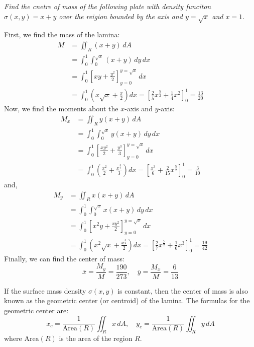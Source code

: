 \documentclass[11pt]{report}
\begin{document}
\begin{example}
    \textit{Find the cnetre of mass of the following plate with density funciton $\sigma(x,y) = x + y$ over the reigion bounded by the axis and $y = \sqrt{x}$ and $x = 1$.}

    First, we find the mass of the lamina:
    \begin{align*}
        M &= \iint_R (x + y) \, dA \\
        &= \int_0^1 \int_0^{\sqrt{x}} (x + y) \, dy \, dx \\
        &= \int_0^1 \left[ xy + \frac{y^2}{2} \right]_{y=0}^{y=\sqrt{x}} \, dx \\
        &= \int_0^1 \left( x\sqrt{x} + \frac{x}{2} \right) dx = \left[ \frac{2}{5} x^{\frac{5}{2}} + \frac{1}{4} x^2 \right]_{0}^{1} = \frac{13}{20}
    \end{align*}
    Now, we find the moments about the $x$-axis and $y$-axis:
    \begin{align*}
        M_x &= \iint_R y(x + y) \, dA \\
        &= \int_0^1 \int_0^{\sqrt{x}} y(x + y) \, dy \, dx \\
        &= \int_0^1 \left[ \frac{xy^2}{2} + \frac{y^3}{3} \right]_{y=0}^{y=\sqrt{x}} \, dx \\
        &= \int_0^1 \left( \frac{x^2}{2} + \frac{x^{\frac{3}{2}}}{3} \right) dx = \left[ \frac{x^3}{6} + \frac{2}{15} x^{\frac{5}{2}} \right]_{0}^{1} = \frac{3}{10}
    \end{align*}
    and,
    \begin{align*}
        M_y &= \iint_R x(x + y) \, dA \\
        &= \int_0^1 \int_0^{\sqrt{x}} x(x + y) \, dy \, dx \\
        &= \int_0^1 \left[ x^2y + \frac{xy^2}{2} \right]_{y=0}^{y=\sqrt{x}} \, dx \\
        &= \int_0^1 \left( x^2\sqrt{x} + \frac{x^{\frac{3}{2}}}{2} \right) dx = \left[ \frac{2}{7} x^{\frac{7}{2}} + \frac{1}{6} x^3 \right]_{0}^{1} = \frac{19}{42}
    \end{align*}
    Finally, we can find the center of mass:
    $$        
    \bar{x} = \frac{M_y}{M} = \frac{190}{273}, \quad \bar{y} = \frac{M_x}{M} = \frac{6}{13}
    $$
\end{example}

\begin{definition}
    If the surface mass density $\sigma(x,y)$ is constant, then the center of mass is also known as the geometric center (or centroid) of the lamina. The formulas for the geometric center are:
    \begin{equation}
        x_c = \frac{1}{\text{Area}(R)} \iint_R x \, dA, \quad y_c = \frac{1}{\text{Area}(R)} \iint_R y \, dA
    \end{equation}
    where $\text{Area}(R)$ is the area of the region $R$.
    
\end{definition}
\end{document}

